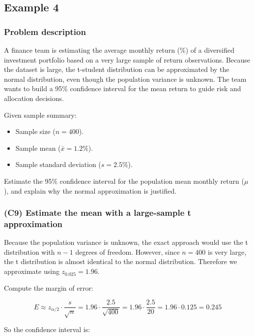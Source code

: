 \subsection{Example 4}\label{sec:interval-example2}

\subsubsection{Problem description}\label{subsec:interval-example2-problem}

A finance team is estimating the average monthly return (\%) of a diversified investment portfolio based on a very large sample of return observations. Because the dataset is large, the t-student distribution can be approximated by the normal distribution, even though the population variance is unknown. The team wants to build a 95\% confidence interval for the mean return to guide risk and allocation decisions.

Given sample summary:

\begin{itemize}
	\item Sample size (\(n = 400\)).
	\item Sample mean (\(\bar{x} = 1.2\%\)).
	\item Sample standard deviation (\(s = 2.5\%\)).
\end{itemize}

Estimate the 95\% confidence interval for the population mean monthly return (\(\mu\)), and explain why the normal approximation is justified.


\subsubsection{(C9) Estimate the mean with a large-sample t approximation}\label{subsubsec:interval-example2-c9}

Because the population variance is unknown, the exact approach would use the t distribution with \(n - 1\) degrees of freedom. However, since \(n = 400\) is very large, the t distribution is almost identical to the normal distribution. Therefore we approximate using \(z_{0.025} = 1.96\).

Compute the margin of error:

\[
E \approx z_{\alpha/2} \cdot \frac{s}{\sqrt{n}}
= 1.96 \cdot \frac{2.5}{\sqrt{400}}
= 1.96 \cdot \frac{2.5}{20}
= 1.96 \cdot 0.125
= 0.245
\]

So the confidence interval is:

